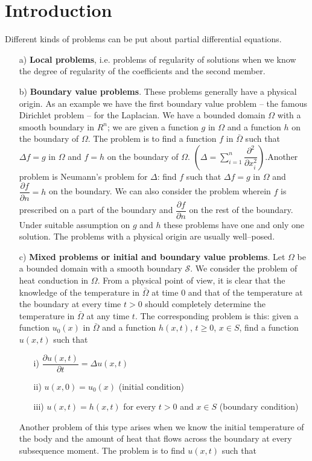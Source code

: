 \chapter{Introduction}

Different kinds of problems can be put about partial differential equations.
\begin{itemize}
\item[a)] {\bf Local problems}, i.e. problems of regularity of solutions when we
 know the 
degree of regularity of the coefficients and the second member.

\item[b)]{\bf Boundary value problems}. These problems generally have a 
physical origin. As an example we have the first boundary value problem --
the famous Dirichlet problem -- for the Laplacian. We have a bounded domain
$\Omega$ with a smooth boundary in $R^n$; we are given a function $g$ in 
$\Omega$ and a function $h$ on the boundary of $\Omega$. The problem is to 
find a function $f$ in $\bar\Omega$ such that $\Delta f = g$ in $\Omega$ and
$f=h$ on the boundary of $\Omega$. $\left( \Delta = \sum\limits_{i=1}^n 
\dfrac{\partial^2}{\partial x_i^2}\right)$.Another problem is Neumann's
problem for $\Delta$: find $f$ such that $\Delta f=g$ in $\Omega$ and 
$\dfrac {\partial f}{\partial n}=h$ on the boundary. We can also consider the 
problem wherein $f$ is prescribed on a part of the boundary and
$\dfrac {\partial f}{\partial n}$ on the rest of the boundary. Under suitable
assumption on $g$ and $h$ these problems have one and only one solution. The
problems with a physical origin are usually well--posed.
\item [c)]{\bf Mixed problems or initial and boundary value problems}. Let 
$\Omega$ be a bounded domain with a smooth boundary $\mathcal{S}$. We 
consider the problem of heat conduction in $\Omega$. From a physical point of 
view, it is clear that the knowledge of the temperature in $\bar \Omega$ at
time $0$ and that of the temperature at the boundary at every time $t>0$
should completely determine the temperature in $\bar \Omega$ at any time $t$.
The corresponding problem is this: given a function $u_0(x)$ in $\bar \Omega$
and a function $h(x, t)$,  $t\geq0$, $x\in S$, find a function $u(x,t)$ such
that
     
\begin{itemize}
\item [i)] $\dfrac{\partial u(x, t)}{\partial t}= \Delta u(x,t)$
\item [ii)] $u(x,0)= u_0(x)$\; (initial condition)
\item [iii)] $u(x,t) = h(x,t)$ for every $t>0$ and $x\in S$ (boundary 
condition)
\end{itemize}
Another problem of this type arises when we know the initial temperature of the
body and the amount of heat that flows across the boundary at every subsequence
moment. The problem is to find $u(x,t)$ such that


\end{itemize}

